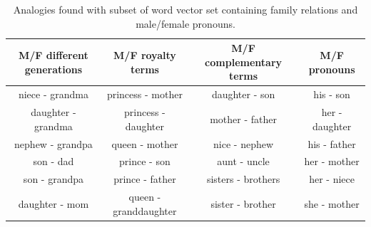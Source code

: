 \begin{table}[h]
	\caption{Analogies found with subset of word vector set containing family relations and male/female pronouns.}
	\label{tab:analogies3}
	\centering
    \begin{tabular}{| c | c | c | c |}
    \hline
    \textbf{M/F different generations} & \textbf{M/F royalty terms} & \textbf{M/F complementary terms} & \textbf{M/F pronouns}\\ \hline
	niece - grandma & princess - mother & daughter - son & his - son\\
	\hline
	daughter - grandma & princess - daughter & mother - father & her - daughter\\
	\hline
	nephew - grandpa & queen - mother & nice - nephew  & his - father \\
	\hline
	son - dad & prince - son & aunt - uncle &her - mother \\
	\hline
	son - grandpa & prince - father & sisters - brothers & her - niece\\
	\hline
	daughter - mom & queen - granddaughter & sister - brother & she - mother\\
    \hline
    \end{tabular}
\end{table}


